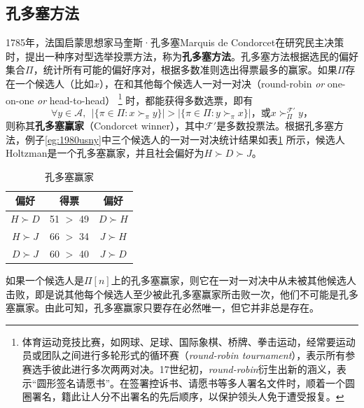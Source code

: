 \subsection{孔多塞方法}
1785年，法国启蒙思想家马奎斯·孔多塞Marquis de Condorcet\cite{condorcet1785essai}在研究民主决策时，提出一种序对型选举投票方法，称为\textbf{孔多塞方法}。孔多塞方法根据选民的偏好集合$\Pi$，统计所有可能的偏好序对，根据多数准则选出得票最多的赢家。如果$\Pi$存在一个候选人（比如$x$），在和其他每个候选人一对一对决（round-robin \textit{or} one-on-one \textit{or} head-to-head）
\footnote{体育运动竞技比赛，如网球、足球、国际象棋、桥牌、拳击运动，经常要运动员或团队之间进行多轮形式的循环赛（\textit{round-robin tournament}），表示所有参赛选手彼此进行多次两两对决。17世纪初，\textit{round-robin}衍生出新的涵义，表示“圆形签名请愿书”。在签署控诉书、请愿书等多人署名文件时，顺着一个圆圈署名，籍此让人分不出署名的先后顺序，以保护领头人免于遭受报复。}
时，都能获得多数选票，即有
\begin{equation}
    \forall y \in \mathcal A,~~\big|\{\pi\in \Pi: x\succ_\pi y\}\big| > \big|\{\pi\in \Pi: y\succ_\pi x\}\big|\text{，或} x\succ_\Pi^\mathcal{F'} y\text{，}
\end{equation}
则称其\textbf{孔多塞赢家}（Condorcet winner），其中$\mathcal{F'}$是多数投票法。根据孔多塞方法，例子\ref{eg:1980usny}中三个候选人的一对一对决统计结果如表\ref{tbl:condorcetwinner} 所示，候选人Holtzman是一个孔多塞赢家，并且社会偏好为$H\succ D\succ J$。
\begin{table}[ht]
    \centering
    \begin{tabular}{c|c|c}
      \hline
      偏好 & 得票 & 偏好\\
      \hline
      $H\succ D$ & 51 $>$ 49 & $D\succ H$\\
      $H\succ J$ & 66 $>$ 34 & $J\succ H$\\
      $D\succ J$ & 60 $>$ 40 & $J\succ D$\\
      \hline
    \end{tabular}
    \caption{孔多塞赢家}
    \label{tbl:condorcetwinner}
\end{table}
如果一个候选人是$\Pi[n]$上的孔多塞赢家，则它在一对一对决中从未被其他候选人击败，即是说其他每个候选人至少被此孔多塞赢家所击败一次，他们不可能是孔多塞赢家。由此可知，孔多塞赢家只要存在必然唯一，但它并非总是存在。
